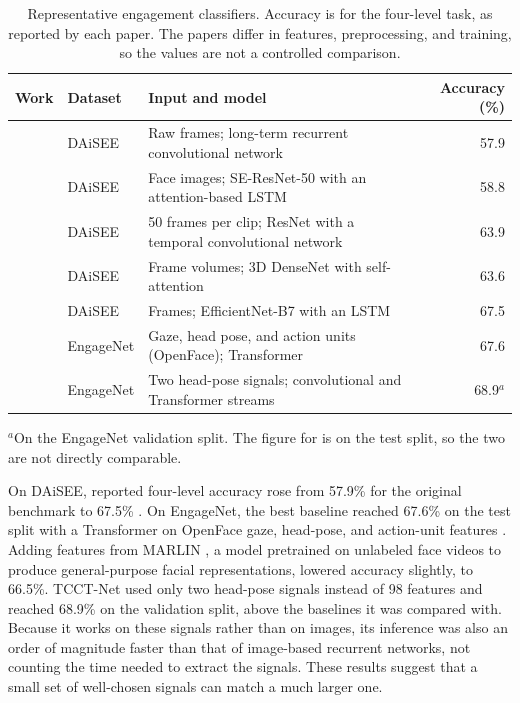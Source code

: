 \begin{table}[t]
   \centering
   \caption[Representative engagement classifiers]{Representative engagement classifiers. Accuracy is for the four-level task, as reported by each paper. The papers differ in features, preprocessing, and training, so the values are not a controlled comparison.}
   \label{tab:rw-models}
   \small
   \begin{tabular}{L{3.0cm}L{1.9cm}L{4.5cm}r}
      \toprule
      Work & Dataset & Input and model & Accuracy (\%) \\
      \midrule
       & DAiSEE & Raw frames; long-term recurrent convolutional network & 57.9 \\
       & DAiSEE & Face images; SE-ResNet-50 with an attention-based LSTM & 58.8 \\
       & DAiSEE & 50 frames per clip; ResNet with a temporal convolutional network & 63.9 \\
       & DAiSEE & Frame volumes; 3D DenseNet with self-attention & 63.6 \\
       & DAiSEE & Frames; EfficientNet-B7 with an LSTM & 67.5 \\
       & EngageNet & Gaze, head pose, and action units (OpenFace); Transformer & 67.6 \\
       & EngageNet & Two head-pose signals; convolutional and Transformer streams & 68.9$^{a}$ \\
      \bottomrule
   \end{tabular}

   \vspace{0.5ex}
   {\footnotesize $^{a}$On the EngageNet validation split. The figure for  is on the test split, so the two are not directly comparable.\par}
\end{table}

On DAiSEE, reported four-level accuracy rose from 57.9\% for the original benchmark \cite{gupta2016} to 67.5\% \cite{selim2022}. On EngageNet, the best baseline reached 67.6\% on the test split with a Transformer on OpenFace gaze, head-pose, and action-unit features \cite{singh2023}. Adding features from MARLIN \cite{cai2023marlin}, a model pretrained on unlabeled face videos to produce general-purpose facial representations, lowered accuracy slightly, to 66.5\%. TCCT-Net \cite{vedernikov2024} used only two head-pose signals instead of 98 features and reached 68.9\% on the validation split, above the baselines it was compared with. Because it works on these signals rather than on images, its inference was also an order of magnitude faster than that of image-based recurrent networks, not counting the time needed to extract the signals. These results suggest that a small set of well-chosen signals can match a much larger one.

